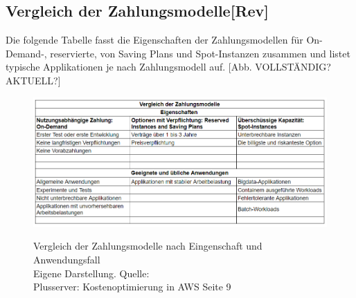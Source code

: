 \subsection*{Vergleich der Zahlungsmodelle[Rev]}
Die folgende Tabelle fasst die Eigenschaften der Zahlungsmodellen für On-Demand-, reservierte, von Saving Plans und Spot-Instanzen zusammen und listet typische Applikationen je nach Zahlungsmodell auf.
[Abb. VOLLSTÄNDIG?AKTUELL?]
\begin{figure}[h!]
    \centering
    \includegraphics[scale=0.63]{sources/Vergleich_der_Zahlungsmodelle}\label{fig:Vergleich_der_Zahlungsmodelle}\\
    \caption[Vergleich der Zahlungsmodelle]{}
    \label{fig:Vergleich_der_Zahlungsmodelle}  Vergleich der Zahlungsmodelle nach Eingenschaft und Anwendungsfall\\
Eigene Darstellung. Quelle: {\cite{AMZ02, AMZ07, AMZ11, AMZ19,SPOT1}}\\
{\cite{PS1}Plusserver: Kostenoptimierung in AWS Seite 9}
  \end{figure}
%

\newpage
